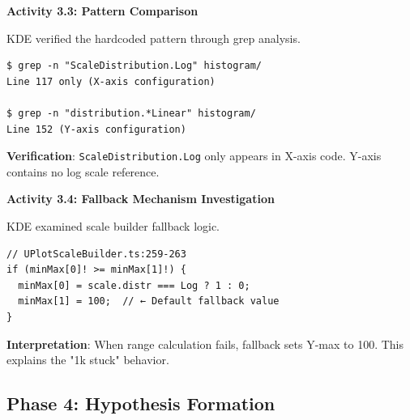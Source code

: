 \documentclass[
    11pt,
    a4paper,
    oneside,
    parskip=full,
    headings=big,
    bibliography=totoc
]{scrartcl}
\newcommand{\code}[1]{\texttt{#1}}
\begin{document}
\begin{actionbox}
    \textbf{Activity 3.3: Pattern Comparison}
    
    KDE verified the hardcoded pattern through grep analysis.
    
    \vspace{0.3cm}
    \begin{evidencebox}
    \begin{verbatim}
$ grep -n "ScaleDistribution.Log" histogram/
Line 117 only (X-axis configuration)

$ grep -n "distribution.*Linear" histogram/
Line 152 (Y-axis configuration)
    \end{verbatim}
    \end{evidencebox}
    
    \vspace{0.3cm}
    \textbf{Verification}: \code{ScaleDistribution.Log} only appears in X-axis code.
    Y-axis contains no log scale reference.
\end{actionbox}

\begin{actionbox}
    \textbf{Activity 3.4: Fallback Mechanism Investigation}
    
    KDE examined scale builder fallback logic.
    
    \vspace{0.3cm}
    \begin{evidencebox}
    \begin{verbatim}
// UPlotScaleBuilder.ts:259-263
if (minMax[0]! >= minMax[1]!) {
  minMax[0] = scale.distr === Log ? 1 : 0;
  minMax[1] = 100;  // ← Default fallback value
}
    \end{verbatim}
    \end{evidencebox}
    
    \vspace{0.3cm}
    \textbf{Interpretation}: When range calculation fails, fallback sets Y-max 
    to 100. This explains the "1k stuck" behavior.
\end{actionbox}

\subsection*{Phase 4: Hypothesis Formation}
\end{document}
